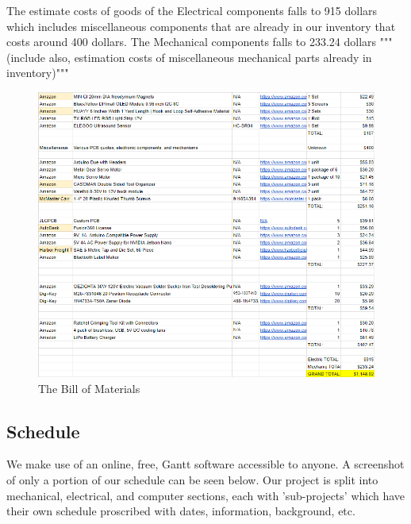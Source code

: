 \documentclass[a4paper, 10pt]{article}
\begin{document}
	The estimate costs of goods of the Electrical components falls to 915 dollars which includes miscellaneous components that are already in our inventory that costs around 400 dollars. The Mechanical components falls to 233.24 dollars """(include also, estimation costs of miscellaneous mechanical parts already in inventory)"""

	\begin{figure} [!h]
		\centering
		\includegraphics[scale=0.9]{Photos/Bills of Material}
		\caption{The Bill of Materials}
		\label{bill_of_mats}
	\end{figure}

	\subsection{Schedule}
	We make use of an online, free, Gantt software accessible to anyone. A screenshot of only a portion of our schedule can be seen below. Our project is split into mechanical, electrical, and computer sections, each with 'sub-projects' which have their own schedule proscribed with dates, information, background, etc.
\end{document}
